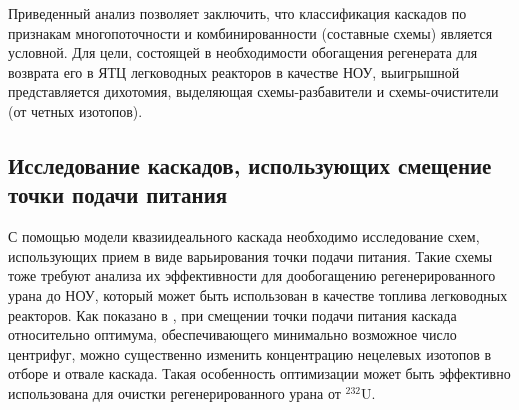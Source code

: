 Приведенный анализ позволяет заключить, что классификация каскадов по признакам многопоточности и комбинированности (составные схемы) является условной.
Для цели, состоящей в необходимости обогащения регенерата для возврата его в ЯТЦ легководных реакторов в качестве НОУ, выигрышной представляется дихотомия, выделяющая схемы-разбавители и схемы-очистители (от четных изотопов).

\subsection{Исследование каскадов, использующих смещение точки подачи питания}
С помощью модели квазиидеального каскада необходимо исследование схем, использующих прием в виде варьирования точки подачи питания.
Такие схемы тоже требуют анализа их эффективности для дообогащению регенерированного урана до НОУ, который может быть использован в качестве топлива легководных реакторов.
Как показано в \cite{palk_2013}, при смещении точки подачи питания каскада относительно оптимума, обеспечивающего минимально возможное число центрифуг, можно существенно изменить концентрацию нецелевых изотопов в отборе и отвале каскада.
Такая особенность оптимизации может быть эффективно использована для очистки регенерированного урана от $^{232}$U.